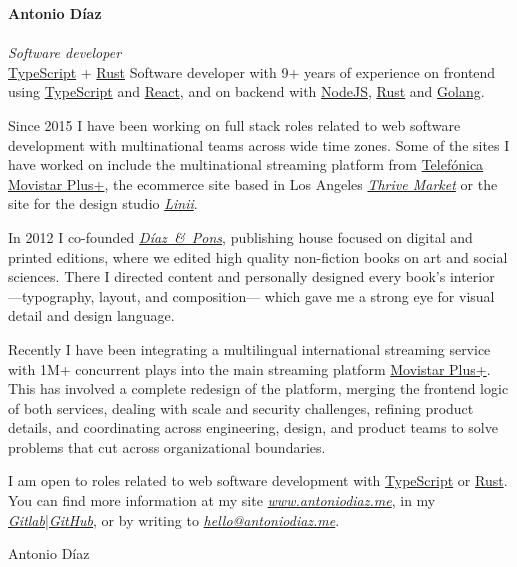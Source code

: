 \documentclass[12pt,a4paper]{article}
\begin{document}
\begin{cv}
  {\fontsize{20pt}{24pt}\selectfont
  {\bfseries\sc\huge{Antonio Díaz}}\\\\
  {\mdseries\it\normalsize{Software developer}}\\
  {\sc\mdseries\normalsize{\href{https://www.typescriptlang.org}{TypeScript} + \href{https://www.rust-lang.org/}{Rust}}}}
  \vspace{4em}
  Software developer with 9+ years of experience on frontend using \href{https://www.typescriptlang.org}{TypeScript} and \href{https://reactjs.org/}{React}, and on backend with \href{https://nodejs.org}{NodeJS}, \href{https://www.rust-lang.org}{Rust} and \href{https://go.dev}{Golang}.

  Since 2015 I have been working on full stack roles related to web software \mbox{development} with multinational teams across wide time zones. Some of the sites I have worked on include the multinational streaming platform from \href{https://www.telefonica.es/}{Telefónica} \href{https://www.movistarplus.es/}{Movistar Plus+}, the ecommerce site based in Los Angeles \href{https://www.thrivemarket.com}{\textit{Thrive Market}} or the site for the design studio \href{https://linii.ru/en}{\textit{Linii}}.

  In 2012 I co-founded \href{https://www.diazpons.es}{\it{\mbox{Díaz \& Pons}}}, publishing house focused on digital and printed editions, where we edited high quality non-fiction books on art and social sciences. There I directed content and personally designed every book's interior —typography, layout, and composition— which gave me a strong eye for visual detail and design language.

  Recently I have been integrating a multilingual international streaming service with 1M+ concurrent plays into the main streaming platform \href{https://www.movistarplus.es/}{Movistar Plus+}. This has involved a complete redesign of the platform, merging the frontend logic of both services, dealing with scale and security challenges, refining product details, and coordinating across engineering, design, and product teams to solve problems that cut across organizational boundaries.

  I am open to roles related to web software development with \href{https://www.typescriptlang.org}{TypeScript} or \href{https://www.rust-lang.org/}{Rust}. You can find more information at my site {\href{https://antoniodiaz.me}{\textit{www.antoniodiaz.me}}}, in my {\href{https://www.git.antoniodiaz.me/antoniodcorrea/}{\textit{Gitlab}}}|{\href{https://github.com/antondc}{\textit{GitHub}}}, or by writing to {\href{mailto:hello@antoniodiaz.me?subject=Hello!&body=...}{\textit{hello@antoniodiaz.me}}}.

  \vspace{2em}
  Antonio Díaz

  \cvplace{}
  \date{\today}
\end{cv}
\end{document}
